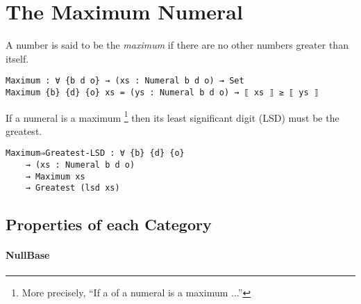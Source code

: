 \documentclass[\main/thesis.tex]{subfiles}
\begin{document}
\section{The Maximum Numeral}\label{maximum}

A number is said to be the \textit{maximum} if there are no other numbers greater
than itself.

\begin{lstlisting}
Maximum : ∀ {b d o} → (xs : Numeral b d o) → Set
Maximum {b} {d} {o} xs = (ys : Numeral b d o) → ⟦ xs ⟧ ≥ ⟦ ys ⟧
\end{lstlisting}

If a numeral is a maximum
\footnote{More precisely, ``If a  of a numeral is a maximum ...''}
 then its least significant digit (LSD) must be the
greatest.

\begin{lstlisting}
Maximum⇒Greatest-LSD : ∀ {b} {d} {o}
    → (xs : Numeral b d o)
    → Maximum xs
    → Greatest (lsd xs)
\end{lstlisting}

\subsection{Properties of each Category}

\paragraph{NullBase}

\begin{center}
    \begin{adjustbox}{max width=\textwidth}
    \end{adjustbox}
\end{center}
\end{document}

